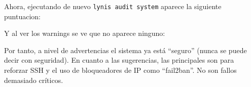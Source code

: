 \documentclass{article}
\begin{document}
Ahora, ejecutando de nuevo \verb|lynis audit system| aparece la siguiente puntuacion:


Y al ver los warnings se ve que no aparece ninguno:


Por tanto, a nivel de advertencias el sistema ya está ``seguro'' (nunca se puede decir con seguridad). En cuanto a las sugerencias, las principales son para reforzar SSH y el uso de bloqueadores de IP como ``fail2ban''. No son fallos demasiado críticos.
\end{document}
